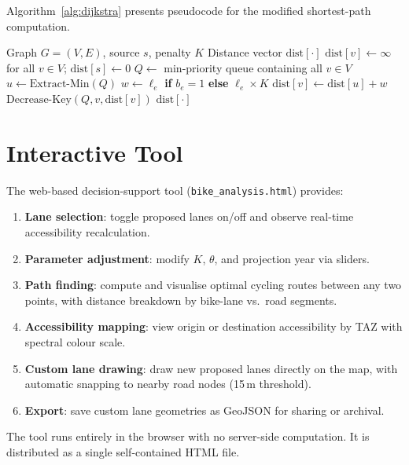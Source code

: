 \documentclass[12pt,a4paper]{article}
\begin{document}
Algorithm~\ref{alg:dijkstra} presents pseudocode for the modified shortest-path computation.

\begin{algorithm}[H]
\caption{Dijkstra's Algorithm with $K$-Penalty}
\label{alg:dijkstra}
\begin{algorithmic}[1]
\Require Graph $G = (V, E)$, source $s$, penalty $K$
\Ensure Distance vector $\mathrm{dist}[\cdot]$
\State $\mathrm{dist}[v] \gets \infty$ for all $v \in V$; \quad $\mathrm{dist}[s] \gets 0$
\State $Q \gets$ min-priority queue containing all $v \in V$
    \State $u \gets \mathrm{Extract\text{-}Min}(Q)$
        \State $w \gets \ell_e$ \textbf{if} $b_e = 1$ \textbf{else} $\ell_e \times K$
            \State $\mathrm{dist}[v] \gets \mathrm{dist}[u] + w$
            \State $\mathrm{Decrease\text{-}Key}(Q, v, \mathrm{dist}[v])$
        \EndIf
    \EndFor
\EndWhile
\State \Return $\mathrm{dist}[\cdot]$
\end{algorithmic}
\end{algorithm}

\section{Interactive Tool}
\label{app:tool}

The web-based decision-support tool (\texttt{bike\_analysis.html}) provides:

\begin{enumerate}[leftmargin=*]
    \item \textbf{Lane selection}: toggle proposed lanes on/off and observe real-time accessibility recalculation.
    \item \textbf{Parameter adjustment}: modify $K$, $\theta$, and projection year via sliders.
    \item \textbf{Path finding}: compute and visualise optimal cycling routes between any two points, with distance breakdown by bike-lane vs.\ road segments.
    \item \textbf{Accessibility mapping}: view origin or destination accessibility by TAZ with spectral colour scale.
    \item \textbf{Custom lane drawing}: draw new proposed lanes directly on the map, with automatic snapping to nearby road nodes (15\,m threshold).
    \item \textbf{Export}: save custom lane geometries as GeoJSON for sharing or archival.
\end{enumerate}

\noindent The tool runs entirely in the browser with no server-side computation. It is distributed as a single self-contained HTML file.
\end{document}
